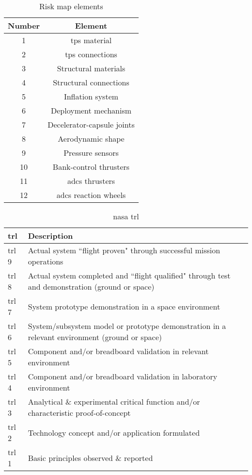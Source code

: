 \begin{table}[h]
	\centering
	\caption{Risk map elements}
	\label{tab:riskmapelements}
	\begin{tabular}{|c|c|}
		\hline 
		\textbf{Number} & \textbf{Element} \\ \hline \hline
		1 & \acrlong{tps} material \\
		2 & \acrlong{tps} connections\\
		3 & Structural materials\\
		4 & Structural connections\\
		5 & Inflation system \\	
		6 & Deployment mechanism\\
		7 & Decelerator-capsule joints\\
		8 & Aerodynamic shape\\
		9 & Pressure sensors\\
		10 & Bank-control thrusters\\
		11 & \gls{adcs} thrusters\\
		12 & \gls{adcs} reaction wheels\\
		\hline
	\end{tabular}
\end{table}

\begin{table}[h]
	\caption[\acrshort{nasa} \acrlong{trl}]{\acrshort{nasa} \acrlong{trl} \cite{NASA2007}}
	\begin{tabular}{|p{}|p{}|}
		\hline
		\textbf{\acrfull{trl}} & \textbf{Description} \\ \hline \hline
		\gls{trl} 9& Actual system ``flight proven" through successful mission operations\\
		\gls{trl} 8& Actual system completed and ``flight qualified" through test and demonstration (ground or space)\\
		\gls{trl} 7& System prototype demonstration in a space environment\\
		\gls{trl} 6& System/subsystem model or prototype demonstration in a relevant environment (ground or space)\\
		\gls{trl} 5& Component and/or breadboard validation in relevant environment\\
		\gls{trl} 4& Component and/or breadboard validation in laboratory environment\\
		\gls{trl} 3& Analytical \& experimental critical function and/or characteristic proof-of-concept\\
		\gls{trl} 2& Technology concept and/or application formulated\\
		\gls{trl} 1& Basic principles observed \& reported \\
		\hline
	\end{tabular}
	\label{tab:trls}
\end{table}